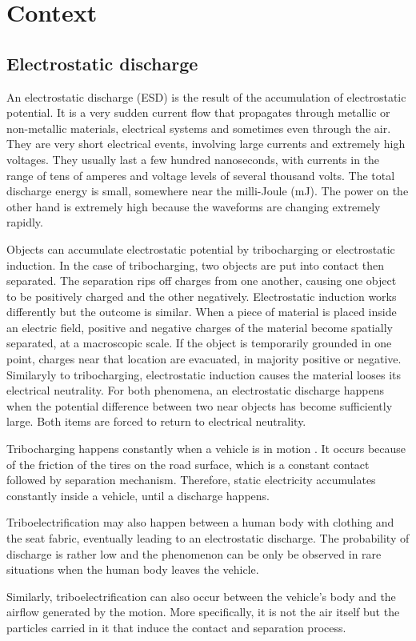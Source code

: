\section{Context}
\subsection{Electrostatic discharge}

An electrostatic discharge (ESD) is the result of the accumulation of electrostatic potential.
It is a very sudden current flow that propagates through metallic or non-metallic materials, electrical systems and sometimes even through the air.
They are very short electrical events, involving large currents and extremely high voltages.
They usually last a few hundred nanoseconds, with currents in the range of tens of amperes and voltage levels of several thousand volts.
The total discharge energy is small, somewhere near the milli-Joule (mJ).
The power on the other hand is extremely high because the waveforms are changing extremely rapidly.

Objects can accumulate electrostatic potential by tribocharging or electrostatic induction.
In the case of tribocharging, two objects are put into contact then separated.
The separation rips off charges from one another, causing one object to be positively charged and the other negatively.
Electrostatic induction works differently but the outcome is similar.
When a piece of material is placed inside an electric field, positive and negative charges of the material become spatially separated, at a macroscopic scale.
If the object is temporarily grounded in one point, charges near that location are evacuated, in majority positive or negative.
Similaryly to tribocharging, electrostatic induction causes the material looses its electrical neutrality.
For both phenomena, an electrostatic discharge happens when the potential difference between two near objects has become sufficiently large.
Both items are forced to return to electrical neutrality.

Tribocharging happens constantly when a vehicle is in motion \cite{generationESDautomotive}.
It occurs because of the friction of the tires on the road surface, which is a constant contact followed by separation mechanism.
Therefore, static electricity accumulates constantly inside a vehicle, until a discharge happens.

Triboelectrification may also happen between a human body with clothing and the seat fabric, eventually leading to an electrostatic discharge.
The probability of discharge is rather low \cite{generationESDautomotive} and the phenomenon can be only be observed in rare situations when the human body leaves the vehicle.

Similarly, triboelectrification can also occur between the vehicle's body and the airflow generated by the motion.
More specifically, it is not the air itself but the particles carried in it that induce the contact and separation process.
